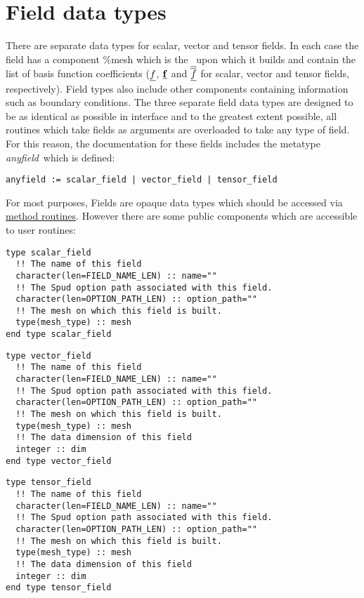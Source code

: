 \documentclass[a4paper, 11pt]{book}
\begin{document}
\section{Field data types}\hypertarget{type:anyfield}{}

There are separate data types for scalar, vector and tensor fields. In each
case the field has a component \%mesh which is the \meshtype\ upon which it
builds and contain the list of basis function coefficients ($\underline{f}$,
$\underline{\mathbf{f}}$ and $\underline{\overline{\overline{f}}}$ for scalar, vector and tensor
fields, respectively). Field types also include other components containing
information such as boundary conditions. The three separate field data types
are designed to be as identical as possible in interface and to the greatest
extent possible, all routines which take fields as arguments are overloaded
to take any type of field. For this reason, the documentation for these
fields includes the metatype \textit{anyfield}\ which is defined:
\begin{lstlisting}[language=bnf]
  anyfield := scalar_field | vector_field | tensor_field
\end{lstlisting}
For most purposes, Fields are opaque data types which should be accessed via
\hyperlink{chap:fieldmeshmethods}{method routines}. However there are some
public components which are accessible to user routines:
\hypertarget{type:scalarfield}{}
\begin{lstlisting}
type scalar_field 
  !! The name of this field
  character(len=FIELD_NAME_LEN) :: name=""
  !! The Spud option path associated with this field.
  character(len=OPTION_PATH_LEN) :: option_path=""
  !! The mesh on which this field is built.
  type(mesh_type) :: mesh
end type scalar_field
\end{lstlisting}

\hypertarget{type:vectorfield}{}
\begin{lstlisting}
type vector_field 
  !! The name of this field
  character(len=FIELD_NAME_LEN) :: name=""
  !! The Spud option path associated with this field.
  character(len=OPTION_PATH_LEN) :: option_path=""
  !! The mesh on which this field is built.
  type(mesh_type) :: mesh
  !! The data dimension of this field
  integer :: dim
end type vector_field
\end{lstlisting}

\hypertarget{type:tensorfield}{}
\begin{lstlisting}
type tensor_field 
  !! The name of this field
  character(len=FIELD_NAME_LEN) :: name=""
  !! The Spud option path associated with this field.
  character(len=OPTION_PATH_LEN) :: option_path=""
  !! The mesh on which this field is built.
  type(mesh_type) :: mesh
  !! The data dimension of this field
  integer :: dim
end type tensor_field
\end{lstlisting}
\end{document}

